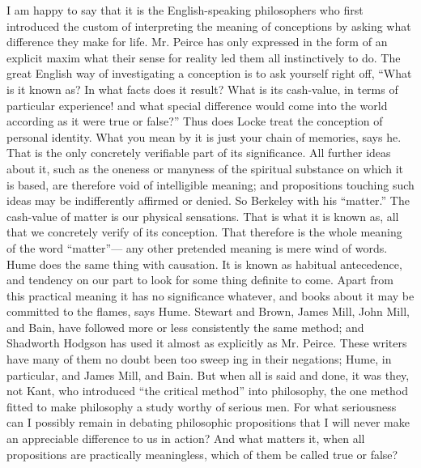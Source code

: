 \documentclass[12pt]{article}
\begin{document}
I am happy to say that it is the English-speaking philosophers who first introduced the custom of interpreting the meaning of conceptions by asking what difference they make for life. Mr. Peirce has only expressed in the form of an explicit maxim what their sense for reality led them all instinctively to do. The great English way of investigating a conception is to ask yourself right off, ``What is it known as? In what facts does it result? What is its cash-value, in terms of particular experience! and what special difference would come into the world according as it were true or false?'' Thus does Locke treat the conception of personal identity. What you mean by it is just your chain of memories, says he. That is the only concretely verifiable part of its significance. All further ideas about it, such as the oneness or manyness of the spiritual substance on which it is based, are therefore void of intelligible meaning; and propositions touching such ideas may be indifferently affirmed or denied. So Berkeley with his ``matter.'' The cash-value of matter is our physical sensations. That is what it is known as, all that we concretely verify of its conception. That therefore is the whole meaning of the word ``matter''--- any other pretended meaning is mere wind of words. Hume does the same thing with causation. It is known as habitual antecedence, and tendency on our part to look for some thing definite to come. Apart from this practical meaning it has no significance whatever, and books about it may be committed to the flames, says Hume. Stewart and Brown, James Mill, John Mill, and Bain, have followed more or less consistently the same method; and Shadworth Hodgson has used it almost as explicitly as Mr. Peirce. These writers have many of them no doubt been too sweep ing in their negations; Hume, in particular, and James Mill, and Bain. But when all is said and done, it was they, not Kant, who introduced ``the critical method'' into philosophy, the one method fitted to make philosophy a study worthy of serious men. For what seriousness can I possibly remain in debating philosophic propositions that I will never make an appreciable difference to us in action? And what matters it, when all propositions are practically meaningless, which of them be called true or false?
\end{document}
